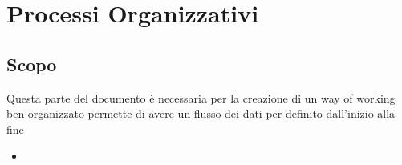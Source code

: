 \section{Processi Organizzativi}
  \subsection{Scopo}
  Questa parte del documento è necessaria per la creazione di un way of working ben organizzato
  permette di avere un flusso dei dati per definito dall'inizio alla fine
  \begin{itemize}
  \item
  \end{itemize}
